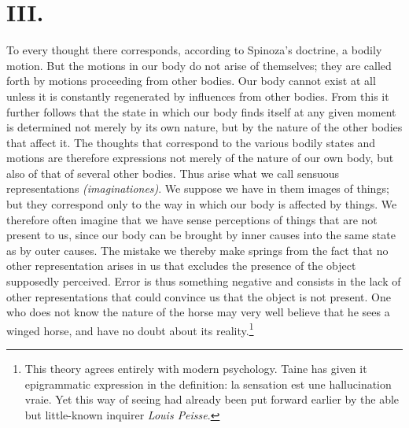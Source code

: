 \documentclass[12pt]{book}
\newcommand{\opage}[1]{\marginnote{\footnotesize\textit{[#1]}}}
\begin{document}
\section*{III.}
\opage{103}To every thought there corresponds, according to Spinoza's doctrine, a bodily
motion. But the motions in our body do not arise of themselves; they are called forth by
motions proceeding from other bodies. Our body cannot exist at all unless it is
constantly regenerated by influences from other bodies. From this it further follows
that the state in which our body finds itself at any given moment is determined not
merely by its own nature, but by the nature of the other bodies that affect it. The
thoughts that correspond to the various bodily states and motions are therefore
expressions not merely of the nature of our own body, but also of that of several other
bodies. Thus arise what we call sensuous representations \textit{(imaginationes)}. We
suppose we have in them images of things; but they correspond only to the way in which
our body is affected by things. We therefore often imagine that we have sense
perceptions of things that are not present to us, since our body can be brought by
inner causes into the same state as by outer causes. The mistake we thereby make springs
from the fact that no other representation arises in us that excludes the presence of
the object supposedly perceived. Error is thus something negative and consists in the
lack of other representations \opage{104}that could convince us that the object is not
present. One who does not know the nature of the horse may very well believe that he
sees a winged horse, and have no doubt about its reality.\footnote{This theory agrees
entirely with modern psychology. Taine has given it epigrammatic expression in the
definition: la sensation est une hallucination vraie. %
Yet this way of seeing had already been put forward earlier by the able but little-known
inquirer \emph{Louis Peisse}.}
\end{document}
